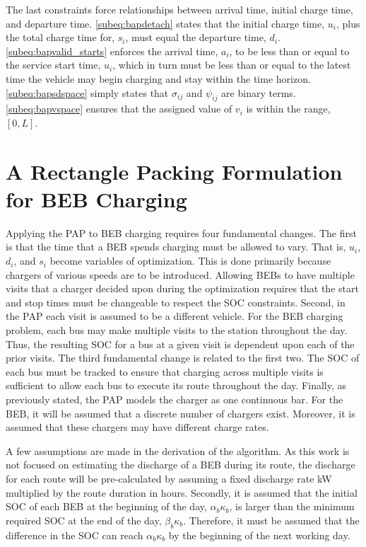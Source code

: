 \documentclass[ee,thesis]{usuthesis}
\begin{document}
The last constraints force relationships between arrival time, initial charge time, and departure time.
\autoref{subeq:bapdetach} states that the initial charge time, \(u_i\), plus the total charge time for, \(s_i\), must equal
the departure time, \(d_i\). \autoref{subeq:bapvalid_starts} enforces the arrival time, \(a_i\), to be less than or equal to
the service start time, \(u_i\), which in turn must be less than or equal to the latest time the vehicle may begin
charging and stay within the time horizon. \autoref{subeq:bapsdspace} simply states that \(\sigma_{ij}\) and \(\psi_{ij}\) are
binary terms. \autoref{subeq:bapvspace} ensures that the assigned value of \(v_i\) is within the range, \([0,L]\).

\section{A Rectangle Packing Formulation for BEB Charging}
\label{sec:problemformulation}
Applying the PAP to BEB charging requires four fundamental changes. The first is that the time that a BEB spends
charging must be allowed to vary. That is, \(u_i\), \(d_i\), and \(s_i\) become variables of optimization. This is done
primarily because chargers of various speeds are to be introduced. Allowing BEBs to have multiple visits that a charger
decided upon during the optimization requires that the start and stop times must be changeable to respect the SOC
constraints. Second, in the PAP each visit is assumed to be a different vehicle. For the BEB charging problem, each bus
may make multiple visits to the station throughout the day. Thus, the resulting SOC for a bus at a given visit is
dependent upon each of the prior visits. The third fundamental change is related to the first two. The SOC of each bus
must be tracked to ensure that charging across multiple visits is sufficient to allow each bus to execute its route
throughout the day. Finally, as previously stated, the PAP models the charger as one continuous bar. For the BEB, it
will be assumed that a discrete number of chargers exist. Moreover, it is assumed that these chargers may have different
charge rates.

A few assumptions are made in the derivation of the algorithm. As this work is not focused on estimating the discharge
of a BEB during its route, the discharge for each route will be pre-calculated by assuming a fixed discharge rate kW
multiplied by the route duration in hours. Secondly, it is assumed that the initial SOC of each BEB at the beginning of
the day, $\alpha_b\kappa_b$, is larger than the minimum required SOC at the end of the day, $\beta_b\kappa_b$.
Therefore, it must be assumed that the difference in the SOC can reach $\alpha_b\kappa_b$ by the beginning of the next
working day.
\end{document}
